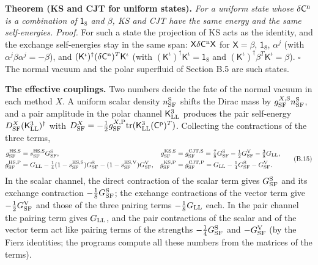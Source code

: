 \documentclass[
  10pt,
]{article}
\begin{document}
\textbf{Theorem (KS and CJT for uniform states).} \emph{For a uniform
state whose \(\delta\mathsf C^{\rm n}\) is a combination of
\(\mathsf 1_8\) and \(\beta\), KS and CJT have the same energy and the
same self-energies.} \emph{Proof.} For such a state the projection of KS
acts as the identity, and the exchange self-energies stay in the same
span: \(\mathsf X\delta\mathsf C^{\rm n}\mathsf X\) for
\(\mathsf X=\beta\), \(\mathsf 1_8\), \(\alpha^j\) (with
\(\alpha^j\beta\alpha^j=-\beta\)), and
\((\mathsf K^\iota)^\dagger(\delta\mathsf C^{\rm n})^T\mathsf K^\iota\)
(with \((\mathsf K^\iota)^\dagger\mathsf K^\iota=\mathsf 1_8\) and
\((\mathsf K^\iota)^\dagger\beta^T\mathsf K^\iota=\beta\)). \(\square\)
The normal vacuum and the polar superfluid of Section B.5 are such
states.

\textbf{The effective couplings.} Two numbers decide the fate of the
normal vacuum in each method \(X\). A uniform scalar density
\(n^{\rm S}_{\rm SF}\) shifts the Dirac mass by
\(g^{X,{\rm S}}_{\rm SF}n^{\rm S}_{\rm SF}\), and a pair amplitude in
the polar channel \(\mathsf K^3_{\rm LL}\) produces the pair self-energy
\(D^X_{\rm SF}(\mathsf K^3_{\rm LL})^\dagger\) with
\(D^X_{\rm SF}=-\tfrac12g^{X,{\rm P}}_{\rm SF}\mathrm{tr}(\mathsf K^3_{\rm LL}(\mathsf C^{\rm p})^T)\).
Collecting the contractions of the three terms,
\[\begin{aligned}g^{{\rm HS},{\rm S}}_{\rm SF}&=s^{\rm HS,S}_{\rm SF}G^{\rm S}_{\rm SF},&g^{{\rm KS},{\rm S}}_{\rm SF}&=g^{{\rm CJT},{\rm S}}_{\rm SF}=\tfrac78G^{\rm S}_{\rm SF}-\tfrac12G^{\rm V}_{\rm SF}-\tfrac38G_{\rm LL},\\g^{{\rm HS},{\rm P}}_{\rm SF}&=G_{\rm LL}-\tfrac14(1-s^{\rm HS,S}_{\rm SF})G^{\rm S}_{\rm SF}-(1-s^{\rm HS,V}_{\rm SF})G^{\rm V}_{\rm SF},&g^{{\rm KS},{\rm P}}_{\rm SF}&=g^{{\rm CJT},{\rm P}}_{\rm SF}=G_{\rm LL}-\tfrac14G^{\rm S}_{\rm SF}-G^{\rm V}_{\rm SF}.\end{aligned}\tag{B.15}\]
In the scalar channel, the direct contraction of the scalar term gives
\(G^{\rm S}_{\rm SF}\) and its exchange contraction
\(-\tfrac18G^{\rm S}_{\rm SF}\); the exchange contractions of the vector
term give \(-\tfrac12G^{\rm V}_{\rm SF}\) and those of the three pairing
terms \(-\tfrac18G_{\rm LL}\) each. In the pair channel the pairing term
gives \(G_{\rm LL}\), and the pair contractions of the scalar and of the
vector term act like pairing terms of the strengths
\(-\tfrac14G^{\rm S}_{\rm SF}\) and \(-G^{\rm V}_{\rm SF}\) (by the
Fierz identities; the programs compute all these numbers from the
matrices of the terms).
\end{document}
